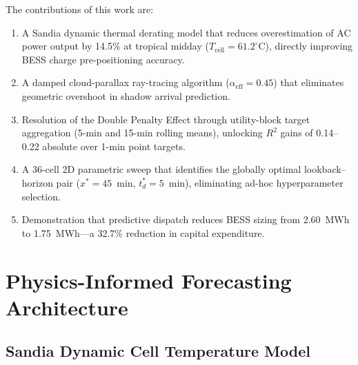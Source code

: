 \documentclass[conference]{IEEEtran}
\begin{document}
The contributions of this work are:
\begin{enumerate}
\item A Sandia dynamic thermal derating model \cite{b1} that reduces
      overestimation of AC power output by 14.5\% at tropical midday
      ($T_{\mathrm{cell}}=61.2^{\circ}$C), directly improving BESS
      charge pre-positioning accuracy.
\item A damped cloud-parallax ray-tracing algorithm ($\alpha_{\mathrm{eff}}=0.45$)
      that eliminates geometric overshoot in shadow arrival prediction.
\item Resolution of the Double Penalty Effect through utility-block target
      aggregation (5-min and 15-min rolling means), unlocking $R^2$ gains of
      0.14--0.22 absolute over 1-min point targets.
\item A 36-cell 2D parametric sweep that identifies the globally optimal
      lookback--horizon pair ($x^{*}=45$~min, $t_d^{*}=5$~min), eliminating
      ad-hoc hyperparameter selection.
\item Demonstration that predictive dispatch reduces BESS sizing from
      2.60~MWh to 1.75~MWh---a 32.7\% reduction in capital expenditure.
\end{enumerate}

\section{Physics-Informed Forecasting Architecture}

\subsection{Sandia Dynamic Cell Temperature Model}
\end{document}
